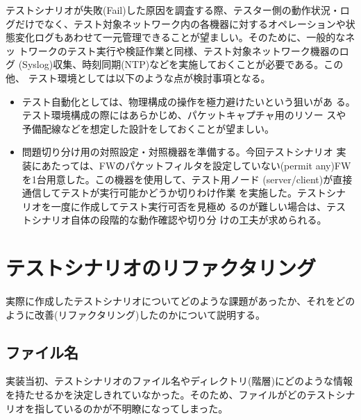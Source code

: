 テストシナリオが失敗(Fail)した原因を調査する際、テスター側の動作状況・ロ
グだけでなく、テスト対象ネットワーク内の各機器に対するオペレーションや状
態変化ログもあわせて一元管理できることが望ましい。そのために、一般的なネッ
トワークのテスト実行や検証作業と同様、テスト対象ネットワーク機器のログ
(Syslog)収集、時刻同期(NTP)などを実施しておくことが必要である。この他、
テスト環境としては以下のような点が検討事項となる。
\begin{itemize}
 \item テスト自動化としては、物理構成の操作を極力避けたいという狙いがあ
       る。テスト環境構成の際にはあらかじめ、パケットキャプチャ用のリソー
       スや予備配線などを想定した設計をしておくことが望ましい。
 \item 問題切り分け用の対照設定・対照機器を準備する。今回テストシナリオ
       実装にあたっては、FWのパケットフィルタを設定していない(permit
       any)FWを1台用意した。この機器を使用して、テスト用ノード
       (server/client)が直接通信してテストが実行可能かどうか切りわけ作業
       を実施した。テストシナリオを一度に作成してテスト実行可否を見極め
       るのが難しい場合は、テストシナリオ自体の段階的な動作確認や切り分
       けの工夫が求められる。
\end{itemize}

 \section{テストシナリオのリファクタリング}

実際に作成したテストシナリオについてどのような課題があったか、それをどの
ように改善(リファクタリング)したのかについて説明する。

  \subsection{ファイル名}

実装当初、テストシナリオのファイル名やディレクトリ(階層)にどのような情報
を持たせるかを決定しきれていなかった。そのため、ファイルがどのテストシナ
リオを指しているのかが不明瞭になってしまった。

